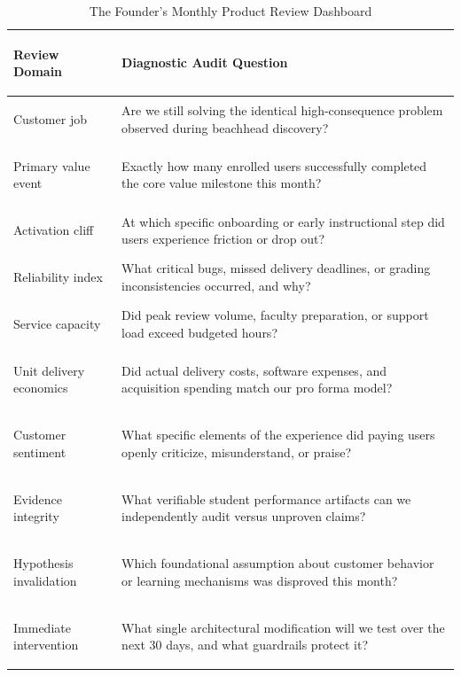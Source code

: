 \begin{table}[t]
\centering
\small
\caption{The Founder's Monthly Product Review Dashboard}
\label{tab:monthly_product_review}
\begin{tabularx}{\textwidth}{>{\bfseries\raggedright\arraybackslash}p{} >{\raggedright\arraybackslash}X}
\toprule
Review Domain & Diagnostic Audit Question \\
\midrule
Customer job & Are we still solving the identical high-consequence problem observed during beachhead discovery? \\
Primary value event & Exactly how many enrolled users successfully completed the core value milestone this month? \\
Activation cliff & At which specific onboarding or early instructional step did users experience friction or drop out? \\
Reliability index & What critical bugs, missed delivery deadlines, or grading inconsistencies occurred, and why? \\
Service capacity & Did peak review volume, faculty preparation, or support load exceed budgeted hours? \\
Unit delivery economics & Did actual delivery costs, software expenses, and acquisition spending match our pro forma model? \\
Customer sentiment & What specific elements of the experience did paying users openly criticize, misunderstand, or praise? \\
Evidence integrity & What verifiable student performance artifacts can we independently audit versus unproven claims? \\
Hypothesis invalidation & Which foundational assumption about customer behavior or learning mechanisms was disproved this month? \\
Immediate intervention & What single architectural modification will we test over the next 30 days, and what guardrails protect it? \\
\bottomrule
\end{tabularx}
\end{table}
